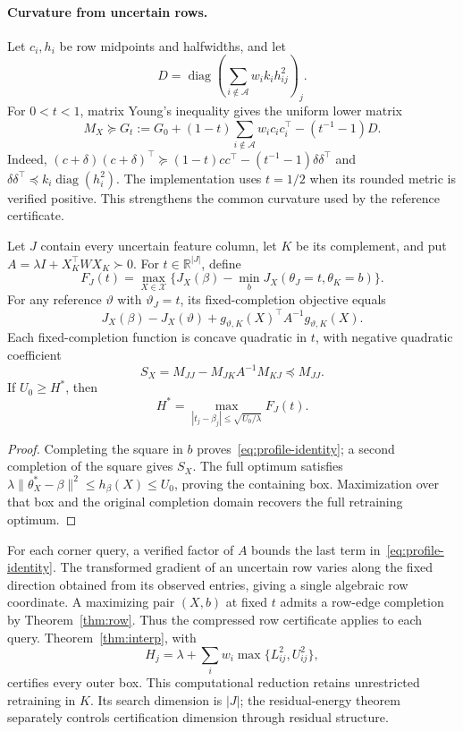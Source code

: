 \paragraph{Curvature from uncertain rows.}
Let $c_i,h_i$ be row midpoints and halfwidths, and let
\[
 D=\operatorname{diag}\!\left(\sum_{i\notin\mathcal A}w_i k_i h_{ij}^2\right)_j.
\]
For $0<t<1$, matrix Young's inequality gives the uniform lower matrix
\begin{equation}
 M_X\succeq G_t:=G_0+(1-t)\sum_{i\notin\mathcal A}w_i c_i c_i^\top
 -(t^{-1}-1)D.\label{eq:young-curvature}
\end{equation}
Indeed, $(c+\delta)(c+\delta)^\top\succeq(1-t)cc^\top-(t^{-1}-1)\delta\delta^\top$ and $\delta\delta^\top\preceq k_i\operatorname{diag}(h_i^2)$. The implementation uses $t=1/2$ when its rounded metric is verified positive. This strengthens the common curvature used by the reference certificate.

\begin{proposition}\label{prop:observed-profile}
Let $J$ contain every uncertain feature column, let $K$ be its complement, and put $A=\lambda I+X_K^\top W X_K\succ0$. For $t\in\mathbb R^{|J|}$, define
\[
 F_J(t)=\max_{X\in\mathcal X}\{J_X(\beta)-\min_b J_X(\theta_J=t,\theta_K=b)\}.
\]
For any reference $\vartheta$ with $\vartheta_J=t$, its fixed-completion objective equals
\begin{equation}
 J_X(\beta)-J_X(\vartheta)+g_{\vartheta,K}(X)^\top A^{-1}g_{\vartheta,K}(X).
 \label{eq:profile-identity}
\end{equation}
Each fixed-completion function is concave quadratic in $t$, with negative quadratic coefficient
\[
 S_X=M_{JJ}-M_{JK}A^{-1}M_{KJ}\preceq M_{JJ}.
\]
If $U_0\ge H^*$, then
\[
 H^*=\max_{|t_j-\beta_j|\le\sqrt{U_0/\lambda}}F_J(t).
\]
\end{proposition}
\begin{proof}
Completing the square in $b$ proves~\eqref{eq:profile-identity}; a second completion of the square gives $S_X$. The full optimum satisfies $\lambda\|\theta_X^*-\beta\|^2\le h_\beta(X)\le U_0$, proving the containing box. Maximization over that box and the original completion domain recovers the full retraining optimum.
\end{proof}
For each corner query, a verified factor of $A$ bounds the last term in~\eqref{eq:profile-identity}. The transformed gradient of an uncertain row varies along the fixed direction obtained from its observed entries, giving a single algebraic row coordinate. A maximizing pair $(X,b)$ at fixed $t$ admits a row-edge completion by Theorem~\ref{thm:row}. Thus the compressed row certificate applies to each query. Theorem~\ref{thm:interp}, with
\[
 H_j=\lambda+\sum_iw_i\max\{L_{ij}^2,U_{ij}^2\},
\]
certifies every outer box. This computational reduction retains unrestricted retraining in $K$. Its search dimension is $|J|$; the residual-energy theorem separately controls certification dimension through residual structure.

